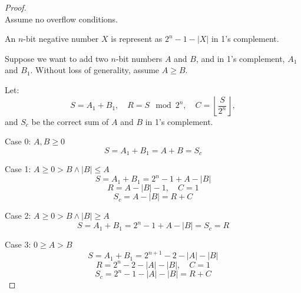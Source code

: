 \documentclass[a4paper,12pt]{report}
\begin{document}
\begin{proof}\mbox{}\\
Assume no overflow conditions.

An $n$-bit negative number $X$ is represent as $2^n-1-|X|$ in 1's complement.

Suppose we want to add two $n$-bit numbers $A$ and $B$, and in 1's complement, $A_1$ and $B_1$. Without loss of generality, assume $A\geq B$.

Let:
\[S = A_1 + B_1,\quad R=S \mod 2^n, \quad C=\left\lfloor\frac{S}{2^n}\right\rfloor,\]
and $S_c$ be the correct sum of $A$ and $B$ in 1's complement.

Case 0: $A,B\geq 0$
\[S =A_1+B_1=A+B=S_c\]

Case 1: $A\geq 0>B\land |B|\leq A$
\[S =A_1+B_1=2^n-1+A-|B|\]
\[R=A-|B|-1,\quad C=1\]
\[S_c=A-|B|=R+C\]

Case 2: $A\geq 0>B\land |B|\geq A$
\[S =A_1+B_1=2^n-1+A-|B|=S_c=R\]

Case 3: $0\geq A>B$
\[S=A_1+B_1=2^{n+1}-2-|A|-|B|\]
\[R=2^n-2-|A|-|B|,\quad C=1\]
\[S_c=2^n-1-|A|-|B|=R+C\]
\end{proof}
\end{document}
